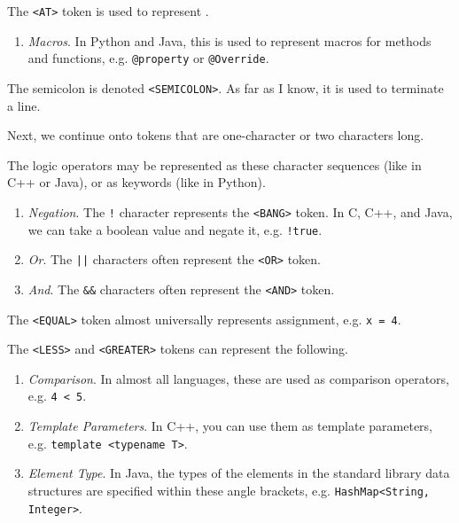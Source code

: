   \begin{example}[At]
    \label{ex:at}
    The \texttt{<AT>} token is used to represent \texttt{\@}. 
    \begin{enumerate}
      \item \textit{Macros}. In Python and Java, this is used to represent macros for methods and functions, e.g. \texttt{@property} or \texttt{@Override}. 
    \end{enumerate}
  \end{example}

  \begin{example}[Semicolon]
    \label{ex:semicolon}
    The semicolon is denoted \texttt{<SEMICOLON>}. As far as I know, it is used to terminate a line. 
  \end{example}

  Next, we continue onto tokens that are one-character or two characters long. 

  \begin{example}
    \label{ex:logic-operators}
    The logic operators may be represented as these character sequences (like in C++ or Java), or as keywords (like in Python). 
    \begin{enumerate}
      \item \textit{Negation}. The \texttt{!} character represents the \texttt{<BANG>} token. In C, C++, and Java, we can take a boolean value and negate it, e.g. \texttt{!true}.
      \item \textit{Or}. The \texttt{||} characters often represent the \texttt{<OR>} token. 
      \item \textit{And}. The \texttt{\&\&} characters often represent the \texttt{<AND>} token. 
    \end{enumerate}
  \end{example}

  \begin{example}[Equal]
    \label{ex:equal}
    The \texttt{<EQUAL>} token almost universally represents assignment, e.g. \texttt{x = 4}. 
  \end{example} 

  \begin{example}
    \label{ex:greater-less}
    The \texttt{<LESS>} and \texttt{<GREATER>} tokens can represent the following. 
    \begin{enumerate}
      \item \textit{Comparison}. In almost all languages, these are used as comparison operators, e.g. \texttt{4 < 5}. 
      \item \textit{Template Parameters}. In C++, you can use them as template parameters, e.g. \texttt{template <typename T>}. 
      \item \textit{Element Type}. In Java, the types of the elements in the standard library data structures are specified within these angle brackets, e.g. \texttt{HashMap<String, Integer>}.
    \end{enumerate}
  \end{example}

